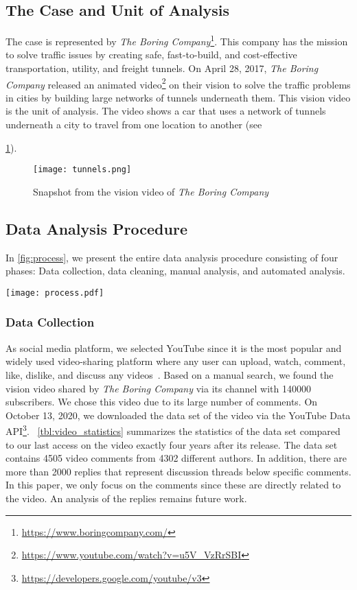 \documentclass[conference]{IEEEtran}
\begin{document}
\subsection{The Case and Unit of Analysis}
The case is represented by \textit{The Boring Company}\footnote{\url{https://www.boringcompany.com/}}. This company has the mission to solve traffic issues by creating safe, fast-to-build, and cost-effective transportation, utility, and freight tunnels. On April 28, 2017, \textit{The Boring Company} released an animated video\footnote{\url{https://www.youtube.com/watch?v=u5V_VzRrSBI}} on their vision to solve the traffic problems in cities by building large networks of tunnels underneath them. This vision video is the unit of analysis. The video shows a car that uses a network of tunnels underneath a city to travel from one location to another (see \figurename{ \ref{fig:vision_video}).

\begin{figure}[htbp]
	\captionsetup{justification=justified}
	\centering
	\texttt{[image: tunnels.png]}
	\caption{Snapshot from the vision video of \textit{The Boring Company}}
	\label{fig:vision_video}
\end{figure}

\subsection{Data Analysis Procedure}
In \figurename{ \ref{fig:process}}, we present the entire data analysis procedure consisting of four phases: Data collection, data cleaning, manual analysis, and automated analysis.

\begin{figure*}[!t]
	\captionsetup{justification=justified}
	\centering
	\texttt{[image: process.pdf]}
	\caption{Overview of the data analysis procedure}
	\label{fig:process}
\end{figure*}

\subsubsection{Data Collection}
As social media platform, we selected YouTube since it is the most popular and widely used video-sharing platform where any user can upload, watch, comment, like, dislike, and discuss any videos~\cite{Burgess.2018, Schwemmer.2018, Poche.2017}. Based on a manual search, we found the vision video shared by \textit{The Boring Company} via its channel with 140000 subscribers.  We chose this video due to its large number of comments. On October 13, 2020, we downloaded the data set of the video via the YouTube Data API\footnote{\url{https://developers.google.com/youtube/v3}}. \tablename{~\ref{tbl:video_statistics}} summarizes the statistics of the data set compared to our last access on the video exactly four years after its release. The data set contains 4505 video comments from 4302 different authors. In addition, there are more than 2000 replies that represent discussion threads below specific comments. In this paper, we only focus on the comments since these are directly related to the video. An analysis of the replies remains future work.

}
\end{document}
